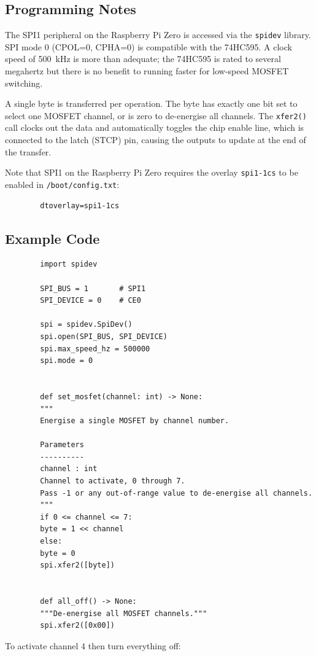 \documentclass[12pt,letterpaper]{article}
\begin{document}
	\subsection{Programming Notes}
	
	The SPI1 peripheral on the Raspberry Pi Zero is accessed via the \texttt{spidev} library.
	SPI mode 0 (CPOL=0, CPHA=0) is compatible with the 74HC595. A clock speed of
	\SI{500}{\kilo\hertz} is more than adequate; the 74HC595 is rated to several megahertz
	but there is no benefit to running faster for low-speed MOSFET switching.
	
	A single byte is transferred per operation. The byte has exactly one bit set to select
	one MOSFET channel, or is zero to de-energise all channels. The \texttt{xfer2()} call
	clocks out the data and automatically toggles the chip enable line, which is connected
	to the latch (STCP) pin, causing the outputs to update at the end of the transfer.
	
	Note that SPI1 on the Raspberry Pi Zero requires the overlay \texttt{spi1-1cs} to be
	enabled in \texttt{/boot/config.txt}:
	
	\begin{verbatim}
		dtoverlay=spi1-1cs
	\end{verbatim}
	
	\subsection{Example Code}
	
	\begin{verbatim}
		import spidev
		
		SPI_BUS = 1       # SPI1
		SPI_DEVICE = 0    # CE0
		
		spi = spidev.SpiDev()
		spi.open(SPI_BUS, SPI_DEVICE)
		spi.max_speed_hz = 500000
		spi.mode = 0
		
		
		def set_mosfet(channel: int) -> None:
		"""
		Energise a single MOSFET by channel number.
		
		Parameters
		----------
		channel : int
		Channel to activate, 0 through 7.
		Pass -1 or any out-of-range value to de-energise all channels.
		"""
		if 0 <= channel <= 7:
		byte = 1 << channel
		else:
		byte = 0
		spi.xfer2([byte])
		
		
		def all_off() -> None:
		"""De-energise all MOSFET channels."""
		spi.xfer2([0x00])
	\end{verbatim}
	
	\noindent To activate channel 4 then turn everything off:
	
\end{document}

